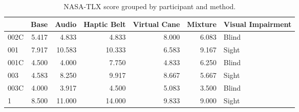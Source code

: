 
\begin{table}[!htb]
\centering
\caption{NASA-TLX score grouped by participant and method.}
\label{tab:nasa_average}
\begin{tabular}{lrrrrrl}
\toprule
{} &  Base &  Audio &  Haptic Belt &  Virtual Cane &  Mixture & Visual Impairment \\
\midrule
002C & 5.417 &  4.833 &        4.833 &         8.000 &    6.083 &             Blind \\
001  & 7.917 & 10.583 &       10.333 &         6.583 &    9.167 &             Sight \\
001C & 4.500 &  4.000 &        7.750 &         4.833 &    6.250 &             Blind \\
003  & 4.583 &  8.250 &        9.917 &         8.667 &    5.667 &             Sight \\
003C & 4.000 &  3.917 &        4.500 &         5.083 &    3.500 &             Blind \\
1    & 8.500 & 11.000 &       14.000 &         9.833 &    9.000 &             Sight \\
\bottomrule
\end{tabular}
\end{table}


